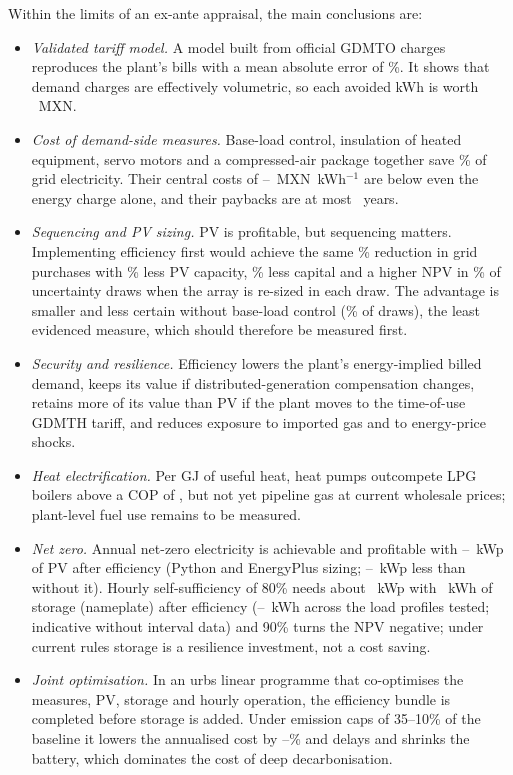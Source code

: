 \documentclass[processes,article,submit,pdftex,moreauthors]{Definitions/mdpi}
\newcommand{\MXN}{MXN}
\begin{document}
Within the limits of an ex-ante appraisal, the main conclusions are:
\begin{itemize}
\item \emph{Validated tariff model.} A model built from official GDMTO charges reproduces the plant's bills with a mean absolute error of \nTVMape\%. It shows that demand charges are effectively volumetric, so each avoided kWh is worth \nTMarg~\MXN.
\item \emph{Cost of demand-side measures.} Base-load control, insulation of heated equipment, servo motors and a compressed-air package together save \nEESavedPct\% of grid electricity. Their central costs of \nCCEBase--\nCCECA~\MXN~kWh$^{-1}$ are below even the energy charge alone, and their paybacks are at most \nPBMaxEE\ years.
\item \emph{Sequencing and PV sizing.} PV is profitable, but sequencing matters. Implementing efficiency first would achieve the same \nGridTwo\% reduction in grid purchases with \nPVSaveFour\% less PV capacity, \nCapexSaveFour\% less capital and a higher NPV in \nProbFourRTwo\% of uncertainty draws when the array is re-sized in each draw. The advantage is smaller and less certain without base-load control (\nProbNoE\% of draws), the least evidenced measure, which should therefore be measured first.
\item \emph{Security and resilience.} Efficiency lowers the plant's energy-implied billed demand, keeps its value if distributed-generation compensation changes, retains more of its value than PV if the plant moves to the time-of-use GDMTH tariff, and reduces exposure to imported gas and to energy-price shocks.
\item \emph{Heat electrification.} Per GJ of useful heat, heat pumps outcompete LPG boilers above a COP of \nCOPBELPG, but not yet pipeline gas at current wholesale prices; plant-level fuel use remains to be measured.
\item \emph{Net zero.} Annual net-zero electricity is achievable and profitable with \nKWpNZE--\nEPKWpNZE~kWp of PV after efficiency (Python and EnergyPlus sizing; \nNZKWpSave--\nEPKWpSave~kWp less than without it). Hourly self-sufficiency of 80\% needs about \nKWpSSE~kWp with \nBatSSE~kWh of storage (nameplate) after efficiency (\nLSBatLo--\nLSBatHi~kWh across the load profiles tested; indicative without interval data) and 90\% turns the NPV negative; under current rules storage is a resilience investment, not a cost saving.
\item \emph{Joint optimisation.} In an urbs linear programme that co-optimises the measures, PV, storage and hourly operation, the efficiency bundle is completed before storage is added. Under emission caps of 35--10\% of the baseline it lowers the annualised cost by \nUCapSaveMin--\nUCapSaveMax\% and delays and shrinks the battery, which dominates the cost of deep decarbonisation.
\end{itemize}
\end{document}
